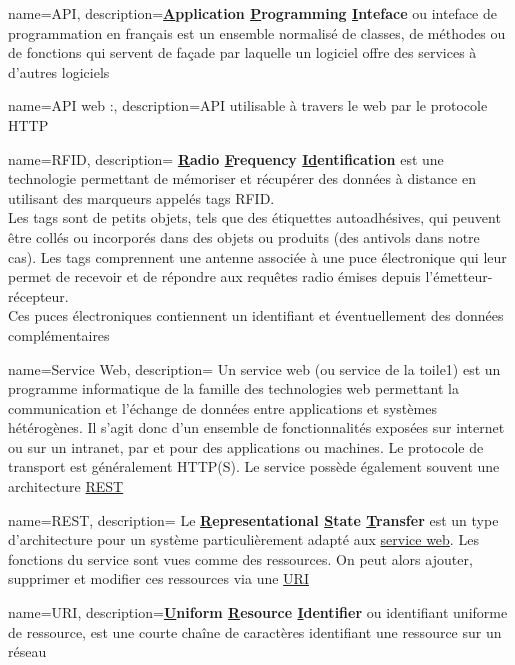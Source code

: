 \makeglossaries

{
    name=API, 
    description={\textbf{\underline{A}pplication \underline{P}rogramming \underline{I}nteface} ou inteface de programmation en français est un ensemble normalisé de classes, de méthodes ou de fonctions qui servent de façade par laquelle un logiciel offre des services à d'autres logiciels}
}

{
    name=API web :, 
    description={API utilisable à travers le web par le protocole HTTP}
}

{
    name=RFID,
    description={
        \textbf{\underline{R}adio \underline{F}requency \underline{Id}entification} est une technologie permettant de mémoriser et récupérer des données à distance en utilisant des marqueurs appelés tags RFID.\\
        Les tags sont de petits objets, tels que des étiquettes autoadhésives, qui peuvent être collés ou incorporés dans des objets ou produits (des antivols dans notre cas). Les tags comprennent une antenne associée à une puce électronique qui leur permet de recevoir et de répondre aux requêtes radio émises depuis l’émetteur-récepteur.\\
        Ces puces électroniques contiennent un identifiant et éventuellement des données complémentaires
    }
}

{
    name=Service Web,
    description=
    {
        Un service web (ou service de la toile1) est un programme informatique de la famille des technologies web permettant la communication et l'échange de données entre applications et systèmes hétérogènes.
        Il s'agit donc d'un ensemble de fonctionnalités exposées sur internet ou sur un intranet, par et pour des applications ou machines.
        Le protocole de transport est généralement HTTP(S). Le service possède également souvent une architecture \underline{\gls{REST}}
    }
}

{
    name=REST, 
    description=
    {
        Le \textbf{\underline{R}epresentational \underline{S}tate \underline{T}ransfer} est un type d'architecture pour un système particulièrement adapté aux \underline{\gls{service web}}. Les fonctions du service sont vues comme des ressources. On peut alors ajouter, supprimer et modifier ces ressources via une \underline{\gls{URI}}
    }
}

{
    name=URI, 
    description={\textbf{\underline{U}niform \underline{R}esource \underline{I}dentifier} ou identifiant uniforme de ressource, est une courte chaîne de caractères identifiant une ressource sur un réseau}
}

